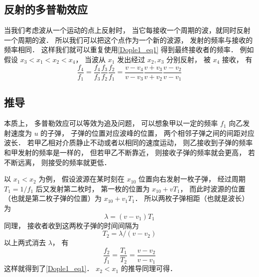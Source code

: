 \subsection{反射的多普勒效应}
当我们考虑波从一个运动的点上反射时， 当它每接收一个周期的波，就同时反射一个周期的波． 所以我们可以把这个点作为一个新的波源， 发射的频率与接收的频率相同． 这样我们就可以重复使用\autoref{Dople1_eq1} 得到最终接收者的频率． 例如假设 $x_3 < x_1 < x_2 < x_4$， 当波从 $x_1$ 发出经过 $x_2, x_3$ 分别反射， 被 $x_4$ 接收， 有
\begin{equation}
\frac{f_4}{f_1} = \frac{f_4}{f_3}\frac{f_3}{f_2}\frac{f_2}{f_1}
= \frac{v - v_4}{v - v_3}\frac{v + v_3}{v + v_2}\frac{v - v_2}{v - v_1}
\end{equation}


\subsection{推导}
本质上， 多普勒效应可以等效为追及问题， 可以想象甲以一定的频率 $f_1$ 向乙发射速度为 $u$ 的子弹， 子弹的位置对应波峰的位置， 两个相邻子弹之间的间距对应波长． 若甲乙相对介质静止不动或者以相同的速度运动， 则乙接收到子弹的频率和甲发射的频率是一样的， 但若甲乙不断靠近， 则接收子弹的频率就会更高， 若不断远离， 则接受的频率就更低．

以 $x_1 < x_2$ 为例， 假设波源在某时刻在 $x_{10}$ 位置向右发射一枚子弹， 经过周期 $T_1 = 1/f_1$ 后又发射第二枚时， 第一枚的位置为 $x_{10} + vT_1$， 而此时波源的位置（也就是第二枚子弹的位置）为 $x_{10} + v_1 T_1$． 所以两枚子弹相距（也就是波长）为
\begin{equation}
\lambda = (v - v_1)T_1
\end{equation}
同理， 接收者收到这两枚子弹的时间间隔为
\begin{equation}
T_2 = \lambda/ (v - v_2)
\end{equation}
以上两式消去 $\lambda$， 有
\begin{equation}
\frac{f_2}{f_1} = \frac{T_1}{T_2} = \frac{v - v_2}{v - v_1}
\end{equation}
这样就得到了\autoref{Dople1_eq1}． $x_2 < x_1$ 的推导同理可得．
